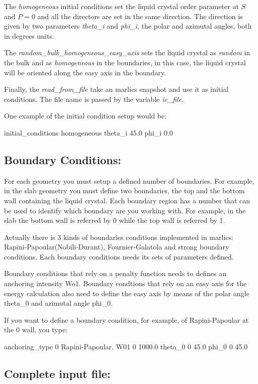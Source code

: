 \documentclass{article}
\begin{document}
The \textit{homogeneous} initial conditions set the liquid crystal order parameter at $S$ and $P=0$ and all the directors are set in the same direction. The direction is given by two parameters \textit{theta_i} and \textit{phi_i}, the polar and azimutal angles, both in degrees units.

The \textit{random_bulk_homogeneous_easy_axis} sets the liquid crystal as \textit{random} in the bulk and as \textit{homogeneous} in the boundaries, in this case, the liquid crystal will be oriented along the easy axis in the boundary.

Finally, the \textit{read_from_file} take an marlics snapshot and use it as initial conditions. The file name is passed by the variable \textit{ic_file}. 

One example of the initial condition setup would be:

initial_conditions homogeneous
theta_i 45.0
phi_i 0.0

\subsection{Boundary Conditions:}

For each geometry you must setup a defined number of boundaries. For example, in the slab geometry you must define two boundaries, the top and the bottom wall containing the liquid crystal. Each boundary region has a number that can be used to identify which boundary are you working with. For example, in the slab the bottom wall is referred by 0 while the top wall is referred by 1.

Actually there is 3 kinds of boundaries conditions implemented in marlics: Rapini-Papoular(Nobili-Durant), Fournier-Galatola and strong boundary conditions. Each boundary conditions needs its sets of parameters defined.

Boundary conditions that rely on a penalty function needs to defines an anchoring intensity Wo1. Boundary condtions that rely on an easy axis for the energy calculation also need to define the easy axis by means of the polar angle theta_0 and azimutal angle phi_0.

If you want to define a boundary condition, for example, of Rapini-Papoular at the 0 wall, you type:

anchoring_type 0 Rapini-Papoular.
W01     0  1000.0
theta_0 0  45.0
phi_0   0  45.0



\subsection{Complete input file:}
\end{document}
